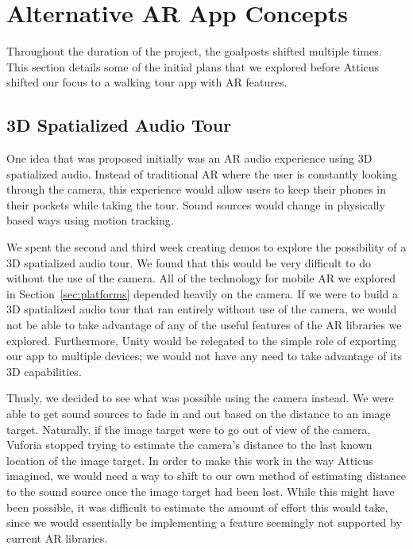\documentclass[a4paper, 10pt, american, titlepage]{article}
\begin{document}
\clearpage

\section{Alternative AR App Concepts}
\label{sec:alternativeArAppConcepts}

Throughout the duration of the project, the goalposts shifted multiple times.
This section details some of the initial plans that we explored before Atticus
shifted our focus to a walking tour app with AR features.

\subsection{3D Spatialized Audio Tour}
\label{sec:3dSpatializedAudioTour}

One idea that was proposed initially was an AR audio experience using 3D
spatialized audio. Instead of traditional AR where the user is constantly
looking through the camera, this experience would allow users to keep their
phones in their pockets while taking the tour. Sound sources would change in
physically based ways using motion tracking.

We spent the second and third week creating demos to explore the possibility of
a 3D spatialized audio tour. We found that this would be very difficult to do
without the use of the camera. All of the technology for mobile AR we explored
in Section~\ref{sec:platforms} depended heavily on the camera. If we were to
build a 3D spatialized audio tour that ran entirely without use of the camera,
we would not be able to take advantage of any of the useful features of the AR
libraries we explored. Furthermore, Unity would be relegated to the simple role
of exporting our app to multiple devices; we would not have any need to take
advantage of its 3D capabilities.

Thusly, we decided to see what was possible using the camera instead. We were
able to get sound sources to fade in and out based on the distance to an image
target. Naturally, if the image target were to go out of view of the camera,
Vuforia stopped trying to estimate the camera's distance to the last known
location of the image target. In order to make this work in the way Atticus
imagined, we would need a way to shift to our own method of estimating distance
to the sound source once the image target had been lost. While this might have
been possible, it was difficult to estimate the amount of effort this would
take, since we would essentially be implementing a feature seemingly not
supported by current AR libraries.
\end{document}
